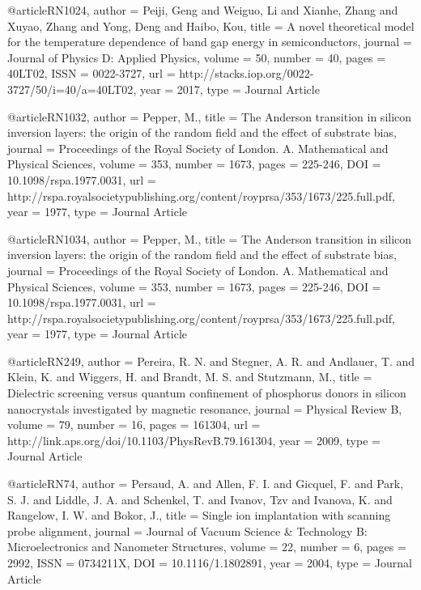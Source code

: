 @article{RN1024,
   author = {Peiji, Geng and Weiguo, Li and Xianhe, Zhang and Xuyao, Zhang and Yong, Deng and Haibo, Kou},
   title = {A novel theoretical model for the temperature dependence of band gap energy in semiconductors},
   journal = {Journal of Physics D: Applied Physics},
   volume = {50},
   number = {40},
   pages = {40LT02},
   ISSN = {0022-3727},
   url = {http://stacks.iop.org/0022-3727/50/i=40/a=40LT02},
   year = {2017},
   type = {Journal Article}
}

@article{RN1032,
   author = {Pepper, M.},
   title = {The Anderson transition in silicon inversion layers: the origin of the random field and the effect of substrate bias},
   journal = {Proceedings of the Royal Society of London. A. Mathematical and Physical Sciences},
   volume = {353},
   number = {1673},
   pages = {225-246},
   DOI = {10.1098/rspa.1977.0031},
   url = {http://rspa.royalsocietypublishing.org/content/royprsa/353/1673/225.full.pdf},
   year = {1977},
   type = {Journal Article}
}

@article{RN1034,
   author = {Pepper, M.},
   title = {The Anderson transition in silicon inversion layers: the origin of the random field and the effect of substrate bias},
   journal = {Proceedings of the Royal Society of London. A. Mathematical and Physical Sciences},
   volume = {353},
   number = {1673},
   pages = {225-246},
   DOI = {10.1098/rspa.1977.0031},
   url = {http://rspa.royalsocietypublishing.org/content/royprsa/353/1673/225.full.pdf},
   year = {1977},
   type = {Journal Article}
}

@article{RN249,
   author = {Pereira, R. N. and Stegner, A. R. and Andlauer, T. and Klein, K. and Wiggers, H. and Brandt, M. S. and Stutzmann, M.},
   title = {Dielectric screening versus quantum confinement of phosphorus donors in silicon nanocrystals investigated by magnetic resonance},
   journal = {Physical Review B},
   volume = {79},
   number = {16},
   pages = {161304},
   url = {http://link.aps.org/doi/10.1103/PhysRevB.79.161304},
   year = {2009},
   type = {Journal Article}
}

@article{RN74,
   author = {Persaud, A. and Allen, F. I. and Gicquel, F. and Park, S. J. and Liddle, J. A. and Schenkel, T. and Ivanov, Tzv and Ivanova, K. and Rangelow, I. W. and Bokor, J.},
   title = {Single ion implantation with scanning probe alignment},
   journal = {Journal of Vacuum Science & Technology B: Microelectronics and Nanometer Structures},
   volume = {22},
   number = {6},
   pages = {2992},
   ISSN = {0734211X},
   DOI = {10.1116/1.1802891},
   year = {2004},
   type = {Journal Article}
}

